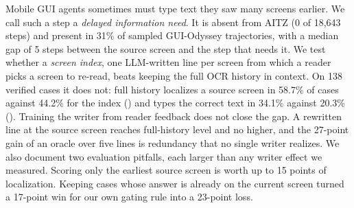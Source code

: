 Mobile GUI agents sometimes must type text they saw many screens earlier. We call such a step a \emph{delayed information need}. It is absent from AITZ (0 of 18,643 steps) and present in 31\% of sampled GUI-Odyssey trajectories, with a median gap of 5 steps between the source screen and the step that needs it. We test whether a \emph{screen index}, one LLM-written line per screen from which a reader picks a screen to re-read, beats keeping the full OCR history in context. On 138 verified cases it does not: full history localizes a source screen in 58.7\% of cases against 44.2\% for the index () and types the correct text in 34.1\% against 20.3\% (). Training the writer from reader feedback does not close the gap. A rewritten line at the source screen reaches full-history level and no higher, and the 27-point gain of an oracle over five lines is redundancy that no single writer realizes. We also document two evaluation pitfalls, each larger than any writer effect we measured. Scoring only the earliest source screen is worth up to 15 points of localization. Keeping cases whose answer is already on the current screen turned a 17-point win for our own gating rule into a 23-point loss.

